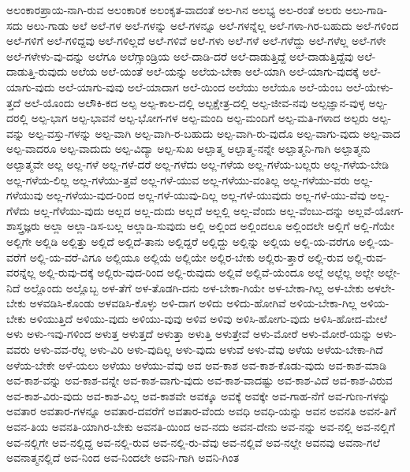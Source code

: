 {ಅಲಂಕಾರಪ್ರಾಯ-ನಾಗಿ-ರುವ
ಅಲಂಕಾರಿಕ
ಅಲಂಕೃತ-ವಾದಂತೆ
ಅಲ-ಗಿನ
ಅಲಭ್ಯ
ಅಲ-ರಂತೆ
ಅಲರು
ಅಲು-ಗಾಡಿ-ಸದು
ಅಲು-ಗಾಡು
ಅಲೆ
ಅಲೆ-ಗಳ
ಅಲೆ-ಗಳನ್ನು
ಅಲೆ-ಗಳನ್ನೂ
ಅಲೆ-ಗಳನ್ನೆಲ್ಲ
ಅಲೆ-ಗಳಾ-ಗಿರ-ಬಹುದು
ಅಲೆ-ಗಳಿಂದ
ಅಲೆ-ಗಳಿಗೆ
ಅಲೆ-ಗಳಿದ್ದವು
ಅಲೆ-ಗಳಿಲ್ಲದೆ
ಅಲೆ-ಗಳಿವೆ
ಅಲೆ-ಗಳು
ಅಲೆ-ಗಳೆ
ಅಲೆ-ಗಳೆದ್ದು
ಅಲೆ-ಗಳೆಲ್ಲ
ಅಲೆ-ಗಳೇ
ಅಲೆ-ಗಳೇಳು-ವು-ದನ್ನು
ಅಲೆಗೂ
ಅಲೆಗ್ಸಾಂಡ್ರಿಯ
ಅಲೆ-ದಾಡಿ-ದರೆ
ಅಲೆ-ದಾಡುತ್ತಿದ್ದೆ
ಅಲೆ-ದಾಡುತ್ತಿದ್ದೆವು
ಅಲೆ-ದಾಡುತ್ತಿ-ರುವುದು
ಅಲೆಯ
ಅಲೆ-ಯಂತೆ
ಅಲೆ-ಯನ್ನು
ಅಲೆಯ-ಬೇಕಾ
ಅಲೆ-ಯಾಗಿ
ಅಲೆ-ಯಾಗು-ವುದಕ್ಕೆ
ಅಲೆ-ಯಾಗು-ವುದು
ಅಲೆ-ಯಾಗು-ವುವು
ಅಲೆ-ಯಾದಾಗ
ಅಲೆ-ಯಿಂದ
ಅಲೆಯು
ಅಲೆಯೂ
ಅಲೆ-ಯೆಂಬ
ಅಲೆ-ಯೇಳು-ತ್ತದೆ
ಅಲೆ-ಯೊಂದು
ಅಲೌಕಿ-ಕದ
ಅಲ್ಪ
ಅಲ್ಪ-ಕಾಲ-ದಲ್ಲಿ
ಅಲ್ಪಕ್ಷೇತ್ರ-ದಲ್ಲಿ
ಅಲ್ಪ-ಜೀವ-ನವು
ಅಲ್ಪಜ್ಞಾನ-ವುಳ್ಳ
ಅಲ್ಪ-ದರಲ್ಲಿ
ಅಲ್ಪ-ಭಾಗ
ಅಲ್ಪ-ಭಾವನೆ
ಅಲ್ಪ-ಭೋಗ-ಗಳ
ಅಲ್ಪ-ಮಂದಿ
ಅಲ್ಪ-ಮಂದಿಗೆ
ಅಲ್ಪ-ಮತಿ-ಗಳಾದ
ಅಲ್ಪರು
ಅಲ್ಪ-ವನ್ನು
ಅಲ್ಪ-ವಸ್ತು-ಗಳನ್ನು
ಅಲ್ಪ-ವಾಗಿ
ಅಲ್ಪ-ವಾಗಿ-ರ-ಬಹುದು
ಅಲ್ಪ-ವಾಗಿ-ರು-ವುದೊ
ಅಲ್ಪ-ವಾಗು-ವುದು
ಅಲ್ಪ-ವಾದ
ಅಲ್ಪ-ವಾದರೂ
ಅಲ್ಪ-ವಾದುದು
ಅಲ್ಪ-ವಿದ್ಯಾ
ಅಲ್ಪ-ಸುಖ
ಅಲ್ಪಾತ್ಮ
ಅಲ್ಪಾತ್ಮ-ನನ್ನೇ
ಅಲ್ಪಾತ್ಮನಿ-ಗಾಗಿ
ಅಲ್ಪಾತ್ಮನು
ಅಲ್ಪಾತ್ಮವೇ
ಅಲ್ಲ
ಅಲ್ಲ-ಗಳೆ
ಅಲ್ಲ-ಗಳೆ-ದರೆ
ಅಲ್ಲ-ಗಳೆದು
ಅಲ್ಲ-ಗಳೆಯ
ಅಲ್ಲ-ಗಳೆಯ-ಬಲ್ಲರು
ಅಲ್ಲ-ಗಳೆಯ-ಬೇಡಿ
ಅಲ್ಲ-ಗಳೆಯ-ಲಿಲ್ಲ
ಅಲ್ಲ-ಗಳೆಯು-ತ್ತವೆ
ಅಲ್ಲ-ಗಳೆ-ಯುವ
ಅಲ್ಲ-ಗಳೆಯು-ವಂತಿಲ್ಲ
ಅಲ್ಲ-ಗಳೆಯು-ವರು
ಅಲ್ಲ-ಗಳೆಯುವು
ಅಲ್ಲ-ಗಳೆಯು-ವುದ-ರಿಂದ
ಅಲ್ಲ-ಗಳೆ-ಯುವು-ದಿಲ್ಲ
ಅಲ್ಲ-ಗಳೆ-ಯುವುದು
ಅಲ್ಲ-ಗಳೆ-ಯು-ವೆವು
ಅಲ್ಲ-ಗೆಳೆದು
ಅಲ್ಲ-ಗೆಳೆಯು-ವುದು
ಅಲ್ಲದ
ಅಲ್ಲ-ದುದು
ಅಲ್ಲದೆ
ಅಲ್ಲಲ್ಲಿ
ಅಲ್ಲ-ವೆಂದು
ಅಲ್ಲ-ವೆಂಬು-ದನ್ನು
ಅಲ್ಲವೆ-ಯೋಗ-ಶಾಸ್ತ್ರಜ್ಞರು
ಅಲ್ಲಾ
ಅಲ್ಲಾ-ಡಿಸ-ಬಲ್ಲ
ಅಲ್ಲಾಡಿ-ಸುವುದು
ಅಲ್ಲಿ
ಅಲ್ಲಿಂದ
ಅಲ್ಲಿಂದಲೂ
ಅಲ್ಲಿಂದಲೇ
ಅಲ್ಲಿಗೆ
ಅಲ್ಲಿ-ಗೆಯೇ
ಅಲ್ಲಿಗೇ
ಅಲ್ಲಿಡಿ
ಅಲ್ಲಿತ್ತು
ಅಲ್ಲಿದೆ
ಅಲ್ಲಿದೆ-ತಾನು
ಅಲ್ಲಿದ್ದರೆ
ಅಲ್ಲಿದ್ದು
ಅಲ್ಲಿನ್ನು
ಅಲ್ಲಿಯ
ಅಲ್ಲಿ-ಯ-ವರೆಗೂ
ಅಲ್ಲಿ-ಯ-ವರೆಗೆ
ಅಲ್ಲಿ-ಯ-ವರೆ-ವಿಗೂ
ಅಲ್ಲಿಯೂ
ಅಲ್ಲಿಯೆ
ಅಲ್ಲಿಯೇ
ಅಲ್ಲಿರ-ಬೇಕು
ಅಲ್ಲಿರು-ತ್ತಾರೆ
ಅಲ್ಲಿ-ರುವ
ಅಲ್ಲಿ-ರುವ-ವರನ್ನೆಲ್ಲ
ಅಲ್ಲಿ-ರುವು-ದಕ್ಕೆ
ಅಲ್ಲಿರು-ವುದ-ರಿಂದ
ಅಲ್ಲಿ-ರುವುದು
ಅಲ್ಲಿವೆ
ಅಲ್ಲಿವೆ-ಯೆಂದೂ
ಅಲ್ಲೆ
ಅಲ್ಲೆಲ್ಲ
ಅಲ್ಲೇ
ಅಲ್ಲೇ-ನಿದೆ
ಅಲ್ಲೊಂದು
ಅಲ್ಲೊಬ್ಬ
ಅಳ-ತೆಗೆ
ಅಳ-ತೊಡಗಿ-ದನು
ಅಳ-ಬೇಕಾ-ಗಿಯೇ
ಅಳ-ಬೇಕಾ-ಗಿಲ್ಲ
ಅಳ-ಬೇಕು
ಅಳಲೇ-ಬೇಕು
ಅಳವಡಿಸಿ-ಕೊಂಡು
ಅಳವಡಿಸಿ-ಕೊಳ್ಳು
ಅಳಿ-ದಾಗ
ಅಳಿದು
ಅಳಿದು-ಹೋಗಿವೆ
ಅಳಿಯ-ಬೇಕಾ-ಗಿಲ್ಲ
ಅಳಿಯ-ಬೇಕು
ಅಳಿಯುತ್ತಿದೆ
ಅಳಿಯು-ವುದು
ಅಳಿಯು-ವುವು
ಅಳಿವ
ಅಳಿವು
ಅಳಿಸಿ-ಹೋಗು-ವುದು
ಅಳಿಸಿ-ಹೋದ-ಮೇಲೆ
ಅಳು
ಅಳು-ಇವು-ಗಳಿಂದ
ಅಳುತ್ತ
ಅಳುತ್ತದೆ
ಅಳುತ್ತಾ
ಅಳುತ್ತಿ
ಅಳುತ್ತೇವೆ
ಅಳು-ಮೋರೆ
ಅಳು-ಮೋರೆ-ಯನ್ನು
ಅಳು-ವವರು
ಅಳು-ವವ-ರೆಲ್ಲ
ಅಳು-ವಿರಿ
ಅಳು-ವುದಿಲ್ಲ
ಅಳು-ವುದು
ಅಳುವೆ
ಅಳು-ವೆವು
ಅಳೆಯ
ಅಳೆಯ-ಬೇಕಾ-ಗಿದೆ
ಅಳೆಯ-ಬೇಕೇ
ಅಳೆ-ಯಲು
ಅಳೆಯು
ಅಳೆಯು-ವೆವು
ಅವ
ಅವ-ಕಾಶ
ಅವ-ಕಾಶ-ಕೊಡು-ವುದು
ಅವ-ಕಾಶ-ಮಾಡಿ
ಅವ-ಕಾಶ-ವನ್ನು
ಅವ-ಕಾಶ-ವನ್ನೇ
ಅವ-ಕಾಶ-ವಾಗು-ವುದು
ಅವ-ಕಾಶ-ವಾದಷ್ಟು
ಅವ-ಕಾಶ-ವಿದೆ
ಅವ-ಕಾಶ-ವಿರುವ
ಅವ-ಕಾಶ-ವಿರು-ವುದು
ಅವ-ಕಾಶ-ವಿಲ್ಲ
ಅವ-ಕಾಶವೇ
ಅವಕ್ಕೂ
ಅವಕ್ಕೆ
ಅವಕ್ಕೇ
ಅವ-ಗಾಹ-ನೆಗೆ
ಅವ-ಗುಣ-ಗಳನ್ನು
ಅವತಾರ
ಅವತಾರ-ಗಳನ್ನೂ
ಅವತಾರ-ದವರೆಗೆ
ಅವತಾರ-ವೆಂದು
ಅವಧಿ
ಅವಧಿ-ಯನ್ನು
ಅವನ
ಅವನತಿ
ಅವನ-ತಿಗೆ
ಅವನ-ತಿಯ
ಅವನತಿ-ಯಾಗಿರ-ಬೇಕು
ಅವನತಿ-ಯಿಂದ
ಅವ-ನದು
ಅವನ-ದೇನು
ಅವ-ನನ್ನು
ಅವ-ನಲ್ಲಿ
ಅವ-ನಲ್ಲಿಗೆ
ಅವ-ನಲ್ಲಿಗೇ
ಅವ-ನಲ್ಲಿದ್ದ
ಅವ-ನಲ್ಲಿ-ರುವ
ಅವ-ನಲ್ಲಿ-ರು-ವೆವು
ಅವ-ನಲ್ಲಿವೆ
ಅವ-ನಲ್ಲೇ
ಅವನವು
ಅವನಾ-ಗಲೆ
ಅವನಾತ್ಮನಲ್ಲಿದೆ
ಅವ-ನಿಂದ
ಅವ-ನಿಂದಲೇ
ಅವನಿ-ಗಾಗಿ
ಅವನಿ-ಗಿಂತ
}
